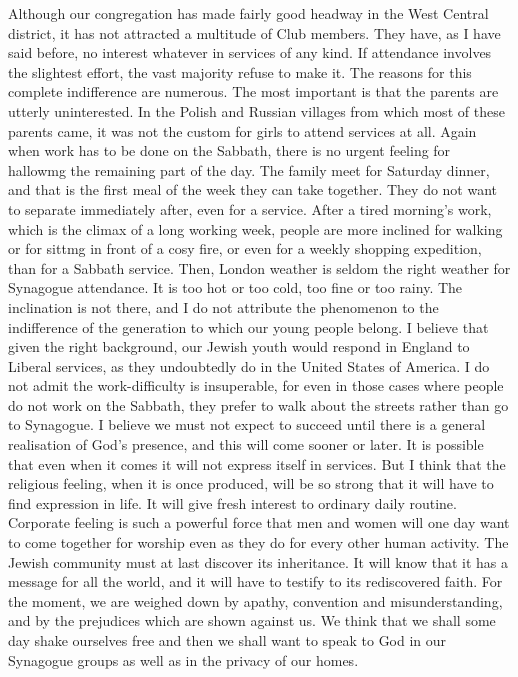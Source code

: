 Although our congregation has made fairly good headway
in the West Central district, it has not attracted a
multitude of Club members. They have, as I have said
before, no interest whatever in services of any kind. If
attendance involves the slightest effort, the vast majority
refuse to make it. The reasons for this complete indifference
are numerous. The most important is that the
parents are utterly uninterested. In the Polish and
Russian villages from which most of these parents came,
it was not the custom for girls to attend services at all.
Again when work has to be done on the Sabbath, there is
no urgent feeling for hallowmg the remaining part of the
day. The family meet for Saturday dinner, and that is
the first meal of the week they can take together. They do
not want to separate immediately after, even for a service.
After a tired morning’s work, which is the climax of a long
working week, people are more inclined for walking or for
sittmg in front of a cosy fire, or even for a weekly shopping
expedition, than for a Sabbath service. Then, London
weather is seldom the right weather for Synagogue attendance.
It is too hot or too cold, too fine or too
rainy. The inclination is not there, and I do not attribute
the phenomenon to the indifference of the generation to
which our young people belong. I believe that given the
right background, our Jewish youth would respond in
England to Liberal services, as they undoubtedly do in
the United States of America. I do not admit the
work-difficulty is insuperable, for even in those cases where
people do not work on the Sabbath, they prefer to walk
about the streets rather than go to Synagogue. I believe
we must not expect to succeed until there is a general
realisation of God’s presence, and this will come sooner
or later. It is possible that even when it comes it will not
express itself in services. But I think that the religious
feeling, when it is once produced, will be so strong that
it will have to find expression in life. It will give fresh
interest to ordinary daily routine. Corporate feeling is
such a powerful force that men and women will one day
want to come together for worship even as they do for
every other human activity. The Jewish community must
at last discover its inheritance. It will know that it has a
message for all the world, and it will have to testify to its
rediscovered faith. For the moment, we are weighed down
by apathy, convention and misunderstanding, and by the
prejudices which are shown against us. We think that we
shall some day shake ourselves free and then we shall want
to speak to God in our Synagogue groups as well as in the
privacy of our homes.

